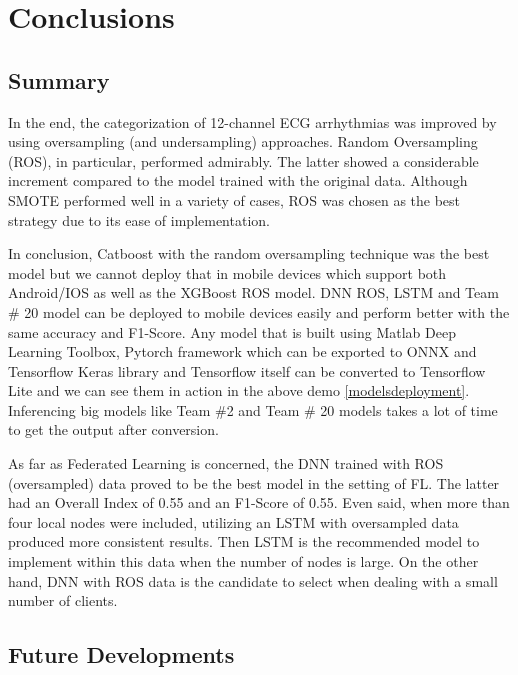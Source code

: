 \chapter{Conclusions} \label{chap6}

\section{Summary} \label{6summary}

In the end, the categorization of 12-channel ECG arrhythmias was improved by using oversampling (and undersampling) approaches. Random Oversampling (ROS), in particular, performed admirably. The latter showed a considerable increment compared to the model trained with the original data. Although SMOTE performed well in a variety of cases, ROS was chosen as the best strategy due to its ease of implementation.

In conclusion, Catboost with the random oversampling technique was the best model but we cannot deploy that in mobile devices which support both Android/IOS as well as the XGBoost ROS model. DNN ROS, LSTM and Team \# 20 model can be deployed to mobile devices easily and perform better with the same accuracy and F1-Score. Any model that is built using Matlab Deep Learning Toolbox, Pytorch framework which can be exported to ONNX and Tensorflow Keras library and Tensorflow itself can be converted to Tensorflow Lite and we can see them in action in the above demo \ref{modelsdeployment}. Inferencing big models like Team \#2 and Team \# 20 models takes a lot of time to get the output after conversion. 

As far as Federated Learning is concerned, the DNN trained with ROS (oversampled) data proved to be the best model in the setting of FL. The latter had an Overall Index of 0.55 and an F1-Score of 0.55. Even said, when more than four local nodes were included, utilizing an LSTM with oversampled data produced more consistent results. Then LSTM is the recommended model to implement within this data when the number of nodes is large. On the other hand, DNN with ROS data is the candidate to select when dealing with a small number of clients.



\section{Future Developments} \label{6futuredevelopments}

